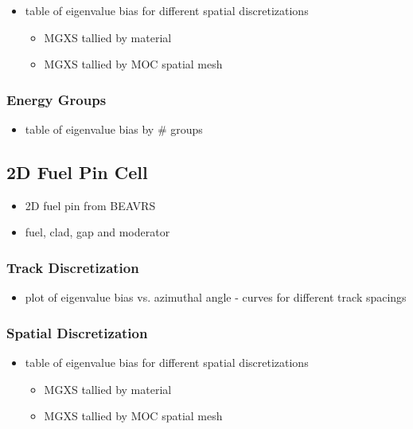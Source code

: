 \begin{itemize}
  \item table of eigenvalue bias for different spatial discretizations
  \begin{itemize}
    \item \ac{MGXS} tallied by material
    \item \ac{MGXS} tallied by \ac{MOC} spatial mesh
  \end{itemize}
\end{itemize}

\subsubsection{Energy Groups}
\label{subsubsec:chap4-slab-energy}

\begin{itemize}
  \item table of eigenvalue bias by \# groups
\end{itemize}

\subsection{2D Fuel Pin Cell}
\label{subsec:chap4-pin}

\begin{itemize}
  \item 2D fuel pin from \ac{BEAVRS}
  \item fuel, clad, gap and moderator
\end{itemize}

\subsubsection{Track Discretization}
\label{subsubsec:chap4-pin-tracks}

\begin{itemize}
  \item plot of eigenvalue bias vs. azimuthal angle - curves for different track spacings
\end{itemize}

\subsubsection{Spatial Discretization}
\label{subsubsec:chap4-pin-space}

\begin{itemize}
  \item table of eigenvalue bias for different spatial discretizations
  \begin{itemize}
    \item \ac{MGXS} tallied by material
    \item \ac{MGXS} tallied by \ac{MOC} spatial mesh
  \end{itemize}
\end{itemize}


